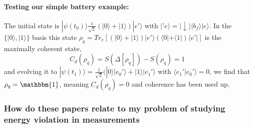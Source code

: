 \documentclass{article}
\begin{document}
\paragraph{Testing our simple battery example:}
The initial state is $|\psi(t_0)\rangle\frac{1}{\sqrt{2}}(|0\rangle+|1\rangle)|e'\rangle$ with $|'e\rangle=|\downarrow\rangle|b_f\rangle|e\rangle$. In the $\{|0\rangle,|1\rangle\}$ basis this state $\rho_q=Tr_e[(|0\rangle+|1\rangle)|e'\rangle(\langle0|+\langle1|)\langle e'|]$ is the maximally coherent state,
\begin{equation}
    C_d(\rho_q)=S(\Delta[\rho_q])-S(\rho_q)=1
\end{equation}
and evolving it to $|\psi(t_1)\rangle=\frac{1}{\sqrt{2}}(|0\rangle|e_0'\rangle+|1\rangle|e_1'\rangle$ with $\langle e_1'|e_0'\rangle=0$, we find that $\rho_q=\mathbbm{1}$, meaning $C_d(\rho_q)=0$ and coherence has been used up. 
\begin{comment}
\subsubsection{How is Coherence not catalytic}

It is firstly not catalytic because the state of the environment changes. It is "apparently" catlaytic because even thoght it chanegs, we can still re-use it to creat a another superposition just like the first one, and the resulting environment state is just as coherent as the initial one even if different.

But these 2 reasons why it is catalytic neglect entanglemenet. Entanglement between the env and sys but also between the qubit superpositions that are created.

In other words. what the original paper shows, is that you can use your coherent env state to creat a qubit superposition, and another and ... however many you want. So great, catalytic coherence. What the second paper shows is that this is neglecting to consider the entanglement between the qubit superpositions that is created, and that considering that, one of the low probability events can cause the coherent source to fully loose its coherence
\end{comment}

\subsubsection{How do these papers relate to my problem of studying energy violation in measurements}
\end{document}
